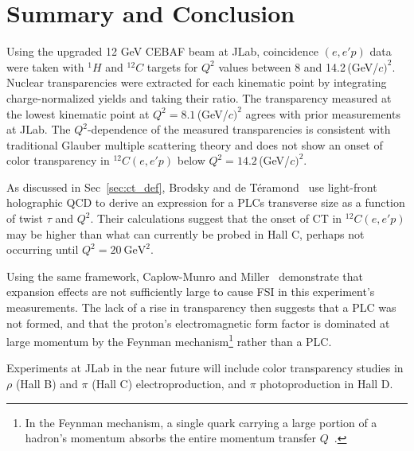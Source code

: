 \chapter{Summary and Conclusion}
Using the upgraded 12\,\,GeV CEBAF beam at JLab, coincidence $(e,e'p)$ data
were taken with $^{1}H$ and $^{12}C$ targets for $Q^2$ values between 8 and
14.2\,(GeV/$c)^2$.
Nuclear transparencies were extracted for each kinematic point by integrating
charge-normalized yields and taking their ratio.
The transparency measured at the lowest kinematic point at
$Q^2=8.1$\,(GeV/$c)^2$ agrees with prior measurements at JLab.
The $Q^2$-dependence of the measured transparencies is consistent with
traditional Glauber multiple scattering theory and does not show an onset of
color transparency in $^{12}C(e,e'p)$ below $Q^2=14.2$\,(GeV/$c)^2$.

As discussed in Sec~\ref{sec:ct_def}, Brodsky and de Téramond~\cite{Brodsky_2021}
use light-front holographic QCD to derive an expression for a PLCs transverse
size as a function of twist $\tau$ and $Q^2$.
Their calculations suggest that the onset of CT in ${}^{12}C(e,e'p)$ may be
higher than what can currently be probed in Hall C, perhaps not occurring
until $Q^2=\SI{20}{\giga\electronvolt\squared}$.

Using the same framework, Caplow-Munro and Miller~\cite{CaplowMunro_2021}
demonstrate that expansion effects are not sufficiently large to cause FSI in
this experiment's measurements.
The lack of a rise in transparency then suggests that a PLC was not formed,
and that the proton's electromagnetic form factor is dominated at large
momentum by the Feynman mechanism\footnote{In the Feynman mechanism, a single
quark carrying a large portion of a hadron's momentum absorbs the entire
momentum transfer $Q$~\cite{Drell_1970}.} rather than a PLC.

Experiments at JLab in the near future will include color transparency studies
in $\rho$ (Hall B) and $\pi$ (Hall C) electroproduction, and $\pi$
photoproduction in Hall D.
